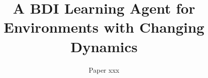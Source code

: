 \documentclass{article}
\title{A BDI Learning Agent for Environments with Changing Dynamics}
\author{
Paper xxx
}
\begin{document}
\maketitle

\begin{abstract}

\end{abstract}













\end{document}
